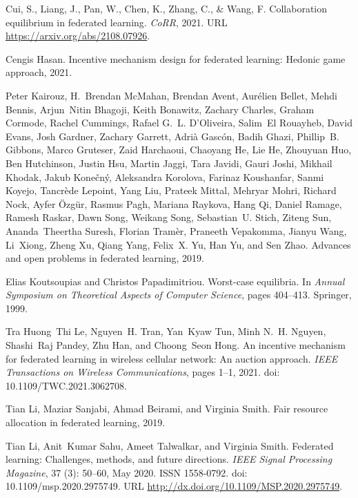 \documentclass{article}
\newcommand{\doi}[1]{doi: #1}
\begin{document}
\begin{thebibliography}{23}
Cui, S., Liang, J., Pan, W., Chen, K., Zhang, C., \& Wang, F.
\newblock Collaboration equilibrium in federated learning.
\newblock \emph{CoRR}, 2021.
\newblock URL \url{https://arxiv.org/abs/2108.07926}.

Cengis Hasan.
\newblock Incentive mechanism design for federated learning: Hedonic game
  approach, 2021.


Peter Kairouz, H.~Brendan McMahan, Brendan Avent, Aurélien Bellet, Mehdi
  Bennis, Arjun~Nitin Bhagoji, Keith Bonawitz, Zachary Charles, Graham Cormode,
  Rachel Cummings, Rafael G.~L. D'Oliveira, Salim~El Rouayheb, David Evans,
  Josh Gardner, Zachary Garrett, Adrià Gascón, Badih Ghazi, Phillip~B.
  Gibbons, Marco Gruteser, Zaid Harchaoui, Chaoyang He, Lie He, Zhouyuan Huo,
  Ben Hutchinson, Justin Hsu, Martin Jaggi, Tara Javidi, Gauri Joshi, Mikhail
  Khodak, Jakub Konečný, Aleksandra Korolova, Farinaz Koushanfar, Sanmi
  Koyejo, Tancrède Lepoint, Yang Liu, Prateek Mittal, Mehryar Mohri, Richard
  Nock, Ayfer Özgür, Rasmus Pagh, Mariana Raykova, Hang Qi, Daniel Ramage,
  Ramesh Raskar, Dawn Song, Weikang Song, Sebastian~U. Stich, Ziteng Sun,
  Ananda~Theertha Suresh, Florian Tramèr, Praneeth Vepakomma, Jianyu Wang,
  Li~Xiong, Zheng Xu, Qiang Yang, Felix~X. Yu, Han Yu, and Sen Zhao.
\newblock Advances and open problems in federated learning, 2019.

Elias Koutsoupias and Christos Papadimitriou.
\newblock Worst-case equilibria.
\newblock In \emph{Annual Symposium on Theoretical Aspects of Computer
  Science}, pages 404--413. Springer, 1999.

Tra Huong~Thi Le, Nguyen~H. Tran, Yan~Kyaw Tun, Minh N.~H. Nguyen, Shashi~Raj
  Pandey, Zhu Han, and Choong~Seon Hong.
\newblock An incentive mechanism for federated learning in wireless cellular
  network: An auction approach.
\newblock \emph{IEEE Transactions on Wireless Communications}, pages 1--1,
  2021.
\newblock \doi{10.1109/TWC.2021.3062708}.

Tian Li, Maziar Sanjabi, Ahmad Beirami, and Virginia Smith.
\newblock Fair resource allocation in federated learning, 2019.

Tian Li, Anit~Kumar Sahu, Ameet Talwalkar, and Virginia Smith.
\newblock Federated learning: Challenges, methods, and future directions.
\newblock \emph{IEEE Signal Processing Magazine}, 37 (3):
  50–60, May 2020.
\newblock ISSN 1558-0792.
\newblock \doi{10.1109/msp.2020.2975749}.
\newblock URL \url{http://dx.doi.org/10.1109/MSP.2020.2975749}.


\end{thebibliography}
\end{document}
